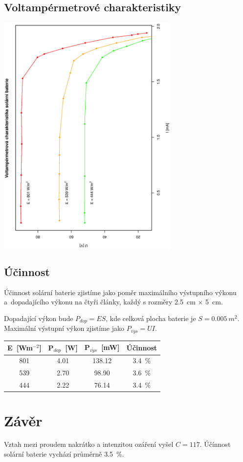 \documentclass[10pt]{article}
\begin{document}
\subsection{Voltampérmetrové charakteristiky}
\begin{center}
\includegraphics[width=9cm,angle=270]{graf3.eps} \\[1cm]
\end{center}
\clearpage
\subsection{Účinnost}
Účinnost solární baterie zjistíme jako poměr maximálního výstupního výkonu 
a~dopadajícího výkonu na čtyři články, každý s rozměry 2.5~cm $\times$ 5~cm.

Dopadající výkon bude $P_{dop} = ES$, kde celková plocha baterie je $S =
0.005~m^2$. Maximální výstupní výkon zjistíme jako $P_{v\acute{y}s} = UI$.

\begin{center}
\begin{tabular}{|c|c|c|c|}
\hline
E~[Wm$^{-2}$] & P$_{dop}$~[W] & P$_{v\acute{y}s}$~[mW] & Účinnost \\
\hline
801 & 4.01 & 138.12 & 3.4~\% \\
539 & 2.70 & 98.90  & 3.6~\% \\
444 & 2.22 & 76.14  & 3.4~\% \\
\hline
\end{tabular}
\end{center}

\section{Závěr} 
Vztah mezi proudem nakrátko a intenzitou ozáření vyšel $C = 117$.
Účínnost solární baterie vychází průměrně 3.5~\%.
\end{document}
